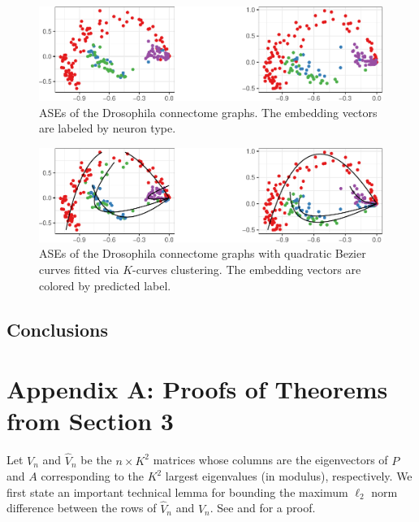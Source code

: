 \documentclass[
  12pt,
]{article}
\theoremstyle{definition}
\theoremstyle{definition}
\theoremstyle{definition}
\theoremstyle{definition}
\theoremstyle{remark}
\begin{document}
\begin{figure}[H]

{\centering \includegraphics{draft_files/figure-latex/mbconnectome-ase-1} 

}

\caption{ASEs of the Drosophila connectome graphs. The embedding vectors are labeled by neuron type.}\label{fig:mbconnectome-ase}
\end{figure}

\begin{figure}[H]

{\centering \includegraphics{draft_files/figure-latex/mbconnectome-kcurves-1} 

}

\caption{ASEs of the Drosophila connectome graphs with quadratic Bezier curves fitted via $K$-curves clustering. The embedding vectors are colored by predicted label.}\label{fig:mbconnectome-kcurves}
\end{figure}

\hypertarget{conclusions}{%
\subsection{Conclusions}\label{conclusions}}

\newpage

\section*{Appendix A: Proofs of Theorems from Section 3}

Let \(V_n\) and \(\hat{V}_n\)
be the \(n \times K^2\) matrices whose columns are the eigenvectors of \(P\) and \(A\) corresponding to the
\(K^2\) largest eigenvalues (in modulus), respectively.
We first state an important technical lemma for bounding the maximum
\(\ell_2\) norm difference between the rows of \(\hat{V}_n\) and
\(V_n\). See \citet{cape_biometrika} and
\citet[Lemma~5]{rubindelanchy2017statistical} for a proof.
\end{document}

